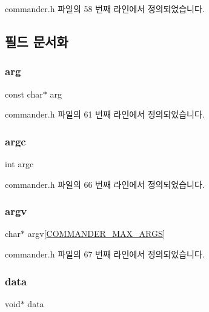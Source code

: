 commander.\+h 파일의 58 번째 라인에서 정의되었습니다.



\subsection{필드 문서화}
\mbox{\label{structcommand_ac3a73711fd7f8a50db1c4b62e41cf852}} 
\subsubsection{\texorpdfstring{arg}{arg}}
{\footnotesize\ttfamily const char$\ast$ arg}



commander.\+h 파일의 61 번째 라인에서 정의되었습니다.

\mbox{\label{structcommand_ad1447518f4372828b8435ae82e48499e}} 
\subsubsection{\texorpdfstring{argc}{argc}}
{\footnotesize\ttfamily int argc}



commander.\+h 파일의 66 번째 라인에서 정의되었습니다.

\mbox{\label{structcommand_aed8f6e06a56bb85b754b64e4136774bd}} 
\subsubsection{\texorpdfstring{argv}{argv}}
{\footnotesize\ttfamily char$\ast$ argv\mbox{[}\mbox{\hyperlink{commander_8h_a6028ef8b1953bf82a53a8aa54c4bf075}{C\+O\+M\+M\+A\+N\+D\+E\+R\+\_\+\+M\+A\+X\+\_\+\+A\+R\+GS}}\mbox{]}}



commander.\+h 파일의 67 번째 라인에서 정의되었습니다.

\mbox{\label{structcommand_a735984d41155bc1032e09bece8f8d66d}} 
\subsubsection{\texorpdfstring{data}{data}}
{\footnotesize\ttfamily void$\ast$ data}




